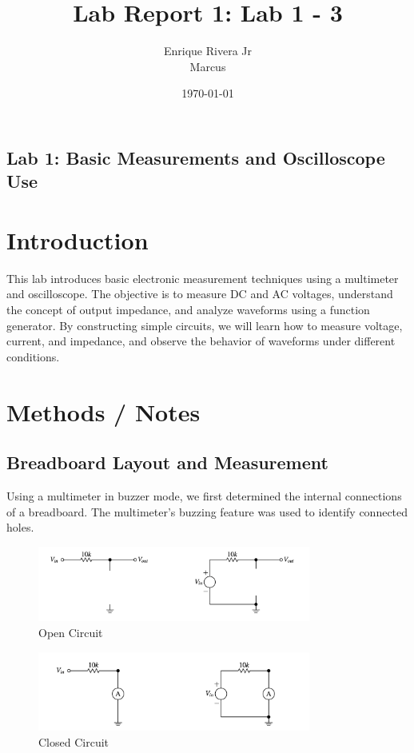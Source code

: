 \documentclass{article}
\title{Lab Report 1: Lab 1 - 3}
\author{Enrique Rivera Jr \\ Marcus}
\date{\today}
\begin{document}
\maketitle

\begin{center}
\section*{Lab 1: Basic Measurements and Oscilloscope Use}
\end{center}

\section{Introduction}
This lab introduces basic electronic measurement techniques using a multimeter and oscilloscope. 
The objective is to measure DC and AC voltages, understand the concept of output impedance, and 
analyze waveforms using a function generator. By constructing simple circuits, we will learn 
how to measure voltage, current, and impedance, and observe the behavior of waveforms under 
different conditions.

\section{Methods / Notes}
    \subsection{Breadboard Layout and Measurement}
    Using a multimeter in buzzer mode, we first determined the internal connections of a 
    breadboard. The multimeter's buzzing feature was used to identify connected holes.

    \begin{figure}[H]
        \centering
        \includegraphics[width=0.8\textwidth]{img/other/Open_Circuit.png} %
        \caption{Open Circuit}
        \label{fig:opencircuit}
    \end{figure}

    \begin{figure}[H]
        \centering
        \includegraphics[width=0.8\textwidth]{img/other/Close_Circuit.png} %
        \caption{Closed Circuit}
        \label{fig:closedcircuit}
    \end{figure}
\end{document}
